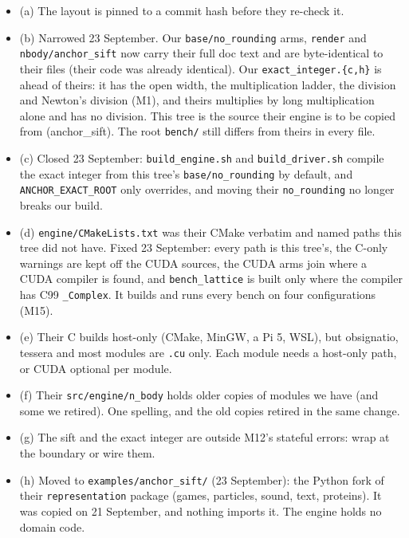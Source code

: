 \begin{enumerate}
\begin{itemize}
\item (a) The layout is pinned to a commit hash before they re-check it.
\item (b) Narrowed 23 September. Our \texttt{base/\allowbreak{}no\_\allowbreak{}rounding} arms, \texttt{render} and \texttt{nbody/\allowbreak{}anchor\_\allowbreak{}sift} now carry their full doc text and are byte-identical to their files (their code was already identical). Our \texttt{exact\_\allowbreak{}integer.\allowbreak{}\{c,h\}} is ahead of theirs: it has the open width, the multiplication ladder, the division and Newton's division (M1), and theirs multiplies by long multiplication alone and has no division. This tree is the source their engine is to be copied from (anchor\_\allowbreak{}sift). The root \texttt{bench/\allowbreak{}} still differs from theirs in every file.
\item (c) Closed 23 September: \texttt{build\_\allowbreak{}engine.\allowbreak{}sh} and \texttt{build\_\allowbreak{}driver.\allowbreak{}sh} compile the exact integer from this tree's \texttt{base/\allowbreak{}no\_\allowbreak{}rounding} by default, and \texttt{ANCHOR\_\allowbreak{}EXACT\_\allowbreak{}ROOT} only overrides, and moving their \texttt{no\_\allowbreak{}rounding} no longer breaks our build.
\item (d) \texttt{engine/\allowbreak{}CMake\allowbreak{}Lists.\allowbreak{}txt} was their CMake verbatim and named paths this tree did not have. Fixed 23 September: every path is this tree's, the C-only warnings are kept off the CUDA sources, the CUDA arms join where a CUDA compiler is found, and \texttt{bench\_\allowbreak{}lattice} is built only where the compiler has C99 \texttt{\_\allowbreak{}Complex}. It builds and runs every bench on four configurations (M15).
\item (e) Their C builds host-only (CMake, MinGW, a Pi 5, WSL), but obsignatio, tessera and most modules are \texttt{.\allowbreak{}cu} only. Each module needs a host-only path, or CUDA optional per module.
\item (f) Their \texttt{src/\allowbreak{}engine/\allowbreak{}n\_\allowbreak{}body} holds older copies of modules we have (and some we retired). One spelling, and the old copies retired in the same change.
\item (g) The sift and the exact integer are outside M12's stateful errors: wrap at the boundary or wire them.
\item (h) Moved to \texttt{examples/\allowbreak{}anchor\_\allowbreak{}sift/\allowbreak{}} (23 September): the Python fork of their \texttt{representation} package (games, particles, sound, text, proteins). It was copied on 21 September, and nothing imports it. The engine holds no domain code.

\end{itemize}
\end{enumerate}

